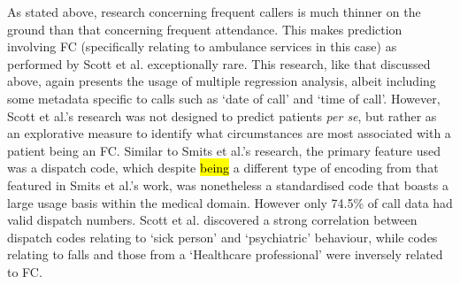 

As stated above, research concerning frequent callers is much thinner on the ground than that concerning frequent attendance. This makes prediction involving FC (specifically relating to ambulance services in this case) as performed by Scott et al.\cite{scott2014describing} exceptionally rare. This research, like that discussed above, again presents the usage of multiple regression analysis, albeit including some metadata specific to calls such as ‘date of call’ and  ‘time of call’. However, Scott et al.'s research was not designed to predict patients \textit{per se}, but rather as an explorative measure to identify what circumstances are most associated with a patient being an FC. Similar to Smits et al.'s research, the primary feature used was a dispatch code, which despite \hl{being} a different type of encoding from that featured in Smits et al.'s work, was nonetheless a standardised code that boasts a large usage basis within the medical domain. However only 74.5\% of call data had valid dispatch numbers. Scott et al. discovered a strong correlation between dispatch codes relating to `sick person' and `psychiatric' behaviour, while codes relating to falls and those from a `Healthcare professional' were inversely related to FC.


